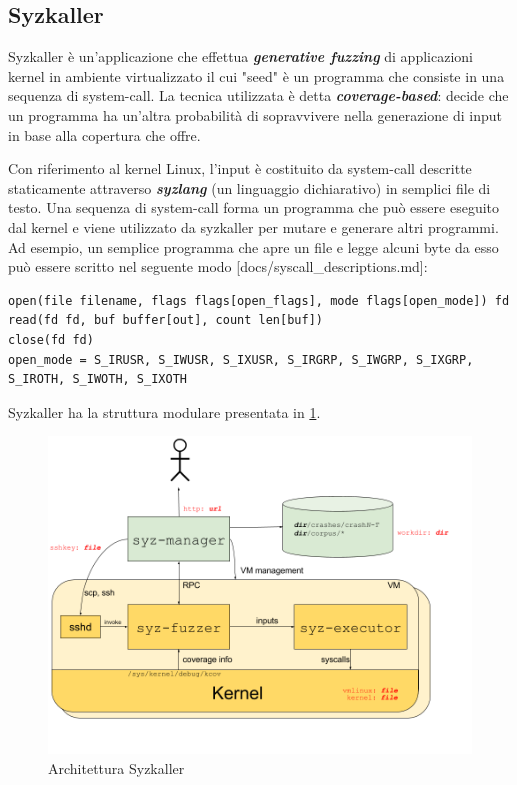 \documentclass{article}
\begin{document}
\subsection{Syzkaller}
Syzkaller\cite{Syzkaller} è un'applicazione che effettua \textbf{\textit{generative fuzzing}} di applicazioni 
kernel in ambiente virtualizzato il cui "seed" è un programma che consiste in una sequenza di system-call. 
La tecnica utilizzata è detta \textbf{\textit{coverage-based}}: decide che un programma ha 
un'altra probabilità di sopravvivere nella generazione di input in base alla copertura 
che offre.

Con riferimento al kernel Linux, l'input è costituito da 
system-call descritte staticamente attraverso \textbf{\textit{syzlang}} (un linguaggio 
dichiarativo) in semplici file di testo. Una sequenza di system-call forma un programma 
che può essere eseguito dal kernel e viene utilizzato da syzkaller per mutare e generare altri 
programmi. Ad esempio, un semplice programma che apre un file e legge alcuni byte da esso 
può essere scritto nel seguente modo \cite{Syzkaller}[docs/syscall\_descriptions.md]:

\begin{verbatim}
open(file filename, flags flags[open_flags], mode flags[open_mode]) fd
read(fd fd, buf buffer[out], count len[buf])
close(fd fd)
open_mode = S_IRUSR, S_IWUSR, S_IXUSR, S_IRGRP, S_IWGRP, S_IXGRP, S_IROTH, S_IWOTH, S_IXOTH
\end{verbatim}

Syzkaller ha la struttura modulare presentata in \cref{fig:syzkaller-arch}. 

\begin{figure}[h]
  \begin{center}
    \includegraphics[width=.75\textwidth]{figures/process_structure.png}
  \end{center}
  \caption{Architettura Syzkaller}\label{fig:syzkaller-arch}
\end{figure}
\end{document}

